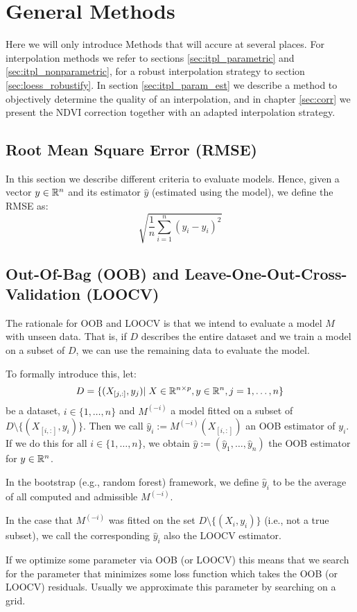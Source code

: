 \section{General Methods}{\label{sec:general_methods}
	Here we will only introduce Methods that will accure at several places. For interpolation methods we refer to sections \ref{sec:itpl_parametric} and \ref{sec:itpl_nonparametric}, for a robust interpolation strategy to section \ref{sec:loess_robustify}. In section \ref{sec:itpl_param_est} we describe a method to objectively determine the quality of an interpolation, and in chapter \ref{sec:corr} we present the NDVI correction together with an adapted interpolation strategy.


	\subsection{Root Mean Square Error (RMSE)}
		In this section we describe different criteria to evaluate models. Hence, given a vector $y\in \mathbb{R}^n$ and its estimator $\hat y$ (estimated using the model), we define the RMSE as:
		\begin{equation}
			\label{eq:rmse}
			 \sqrt{\frac{1}{n}\sum_{i=1}^n (y_i - \hat y_i)^2}
		\end{equation}
		
		\subsection{Out-Of-Bag ({OOB}) and Leave-One-Out-Cross-Validation ({LOOCV})}{ \label{sec:OOB_LOOCV}
		The rationale for OOB and LOOCV is that we intend to evaluate a model $M$ with unseen data. That is, if $D$ describes the entire dataset and we train a model on a subset of $D$, we can use the remaining data to evaluate the model. 
		
		To formally introduce this, let:
		$$
			D=\{(X_{[j,:]},y_j)|\; X\in\mathbb{R}^{n\times p}, y\in \mathbb{R}^n, j=1,\dots,n\}
		$$
		be a dataset, $i\in \{1,\dots,n\}$ and $M^{(-i)}$ a model fitted on a subset of $D\setminus\{(X_{[i,:]},y_i)\}$. Then we call $\hat y_i:= M^{(-i)}(X_{[i,:]})$ an {OOB} estimator of $y_i$. If we do this for all $i\in\{1,\dots,n\}$, we obtain $\hat y := \left(\hat y_1,\dots,\hat y_n\right)$ the OOB estimator for $y\in \mathbb{R}^n$.

		In the bootstrap (e.g., random forest) framework, we define $\hat y_i$ to be the average of all computed and admissible $M^{(-i)}$. 
		
		In the case that $M^{(-i)}$ was fitted on the set $D\setminus\{(X_i,y_i)\}$ (i.e., not a true subset), we call the corresponding $\hat y_i$ also the LOOCV estimator.	

		If we optimize some parameter via OOB (or LOOCV) this means that we search for the parameter that minimizes some loss function which takes the OOB (or LOOCV) residuals. Usually we approximate this parameter by searching on a grid. 
	}

}
